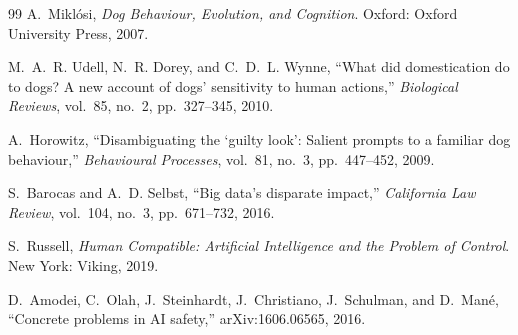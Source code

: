 \begin{thebibliography}{99}
A.~Mikl\'osi, \emph{Dog Behaviour, Evolution, and Cognition}. Oxford: Oxford
University Press, 2007.

M.~A.~R. Udell, N.~R. Dorey, and C.~D.~L. Wynne, ``What did domestication do
to dogs? A new account of dogs' sensitivity to human actions,''
\emph{Biological Reviews}, vol.~85, no.~2, pp.~327--345, 2010.

A.~Horowitz, ``Disambiguating the `guilty look': Salient prompts to a
familiar dog behaviour,'' \emph{Behavioural Processes}, vol.~81, no.~3,
pp.~447--452, 2009.

S.~Barocas and A.~D. Selbst, ``Big data's disparate impact,''
\emph{California Law Review}, vol.~104, no.~3, pp.~671--732, 2016.

S.~Russell, \emph{Human Compatible: Artificial Intelligence and the Problem
of Control}. New York: Viking, 2019.

D.~Amodei, C.~Olah, J.~Steinhardt, J.~Christiano, J.~Schulman, and D.~Man\'e,
``Concrete problems in AI safety,'' arXiv:1606.06565, 2016.

\end{thebibliography}
